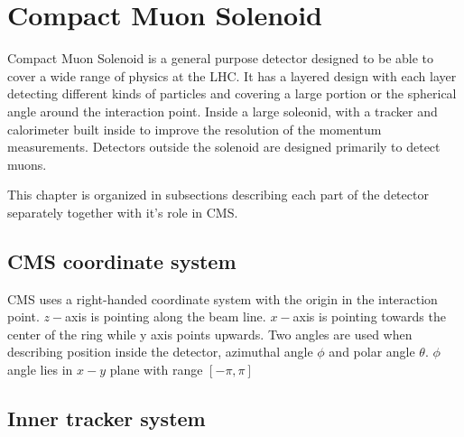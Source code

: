 \chapter{Compact Muon Solenoid} %

\label{Chapter4} %


Compact Muon Solenoid is a general purpose detector designed to be able to cover a wide range of physics at the LHC. It has a layered design with each layer detecting different kinds of particles and covering a large portion or the spherical angle around the interaction point. Inside a large soleonid, with a tracker and calorimeter built inside to improve the resolution of the momentum measurements. Detectors outside the solenoid are designed primarily to detect muons. 
\par This chapter is organized in subsections describing each part of the detector separately together with it's role in CMS.  


\section{CMS coordinate system}

CMS uses a right-handed coordinate system with the origin in the interaction point. $z-$axis is pointing along the beam line. $x-$axis is pointing towards the center of the ring while y axis points upwards. Two angles are used when describing position inside the detector, azimuthal angle $\phi$ and polar angle $\theta$. $\phi$ angle lies in $x-y$ plane with range $[-\pi,\pi]$


\section{Inner tracker system}


